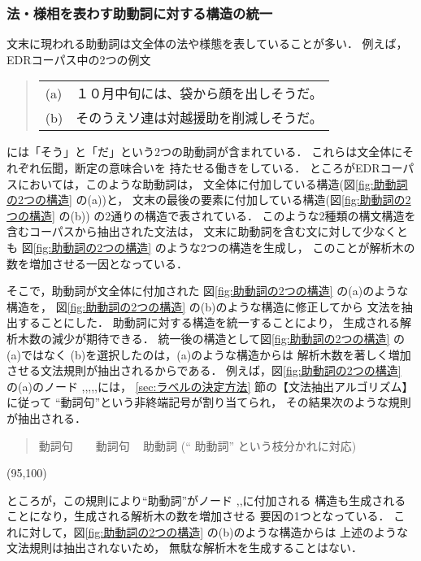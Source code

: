 \subsubsection{法・様相を表わす助動詞に対する構造の統一}


文末に現われる助動詞は文全体の法や様態を表していることが多い．
例えば，EDRコーパス中の2つの例文
\begin{quote}
  \smallskip
  \begin{tabular}{ll}
    (a) & １０月中旬には、袋から顔を出しそうだ。 \\
    (b) & そのうえソ連は対越援助を削減しそうだ。 \\
  \end{tabular}
  \smallskip
\end{quote}
には「そう」と「だ」という2つの助動詞が含まれている．
これらは文全体にそれぞれ伝聞，断定の意味合いを
持たせる働きをしている．
ところがEDRコーパスにおいては，このような助動詞は，
文全体に付加している構造(図\ref{fig:助動詞の2つの構造} の(a))と，
文末の最後の要素に付加している構造(図\ref{fig:助動詞の2つの構造} の(b))
の2通りの構造で表されている．
このような2種類の構文構造を含むコーパスから抽出された文法は，
文末に助動詞を含む文に対して少なくとも
図\ref{fig:助動詞の2つの構造} のような2つの構造を生成し，
このことが解析木の数を増加させる一因となっている．


そこで，助動詞が文全体に付加された
図\ref{fig:助動詞の2つの構造} の(a)のような構造を，
図\ref{fig:助動詞の2つの構造} の(b)のような構造に修正してから
文法を抽出することにした．
助動詞に対する構造を統一することにより，
生成される解析木数の減少が期待できる．
統一後の構造として図\ref{fig:助動詞の2つの構造} の(a)ではなく
(b)を選択したのは，(a)のような構造からは
解析木数を著しく増加させる文法規則が抽出されるからである．
例えば，図\ref{fig:助動詞の2つの構造} の(a)のノード
,,,,,には，
\ref{sec:ラベルの決定方法} 節の【文法抽出アルゴリズム】に従って
``動詞句''という非終端記号が割り当てられ，
その結果次のような規則が抽出される．
\begin{quote}
  動詞句 ~  ~ 動詞句 ~ 助動詞  \qquad
  (``   助動詞'' という枝分かれに対応)
\end{quote}

\begin{center}
  \atari(95,100)
\end{center}

\noindent
ところが，この規則により``助動詞''がノード
,,に付加される
構造も生成されることになり，生成される解析木の数を増加させる
要因の1つとなっている．
これに対して，図\ref{fig:助動詞の2つの構造} の(b)のような構造からは
上述のような文法規則は抽出されないため，
無駄な解析木を生成することはない．
\vspace{-1mm}
